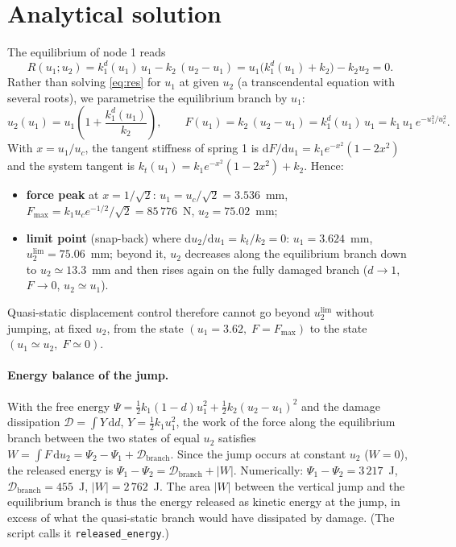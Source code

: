 \documentclass[11pt,a4paper]{article}
\newcommand{\dd}{\mathrm{d}}
\newcommand{\kd}{k_1^{d}}
\begin{document}
\section{Analytical solution}
\label{sec:ana}
The equilibrium of node 1 reads
\begin{equation}
  R(u_1;u_2) = \kd(u_1)\,u_1 - k_2\,(u_2-u_1) = u_1\bigl(\kd(u_1)+k_2\bigr) - k_2u_2 = 0 .
  \label{eq:res}
\end{equation}
Rather than solving \eqref{eq:res} for $u_1$ at given $u_2$ (a transcendental equation with
several roots), we parametrise the equilibrium branch by $u_1$:
\begin{equation}
  u_2(u_1) = u_1\left(1+\frac{\kd(u_1)}{k_2}\right),\qquad
  F(u_1) = k_2\,(u_2-u_1) = \kd(u_1)\,u_1 = k_1\,u_1\,e^{-u_1^2/u_c^2}.
  \label{eq:ana}
\end{equation}
With $x=u_1/u_c$, the tangent stiffness of spring 1 is $\dd F/\dd u_1 = k_1 e^{-x^2}(1-2x^2)$ and
the system tangent is $k_t(u_1) = k_1e^{-x^2}(1-2x^2)+k_2$. Hence:
\begin{itemize}
  \item \textbf{force peak} at $x=1/\sqrt2$: $u_1 = u_c/\sqrt2 = 3.536$~mm,
        $F_{\max} = k_1 u_c e^{-1/2}/\sqrt2 = 85\,776$~N, $u_2 = 75.02$~mm;
  \item \textbf{limit point} (snap-back) where $\dd u_2/\dd u_1 = k_t/k_2 = 0$:
        $u_1 = 3.624$~mm, $u_2^{\lim} = 75.06$~mm; beyond it, $u_2$ decreases along the
        equilibrium branch down to $u_2 \simeq 13.3$~mm and then rises again on the fully
        damaged branch ($d\to1$, $F\to0$, $u_2\simeq u_1$).
\end{itemize}
Quasi-static displacement control therefore cannot go beyond $u_2^{\lim}$ without jumping, at
fixed $u_2$, from the state $(u_1 = 3.62,\;F=F_{\max})$ to the state $(u_1\simeq u_2,\;F\simeq0)$.

\paragraph{Energy balance of the jump.}
With the free energy $\Psi = \tfrac12 k_1(1-d)u_1^2 + \tfrac12 k_2(u_2-u_1)^2$ and the damage
dissipation $\mathcal D = \int Y\,\dd d$, $Y=\tfrac12 k_1u_1^2$, the work of the force along the
equilibrium branch between the two states of equal $u_2$ satisfies
$W = \int F\,\dd u_2 = \Psi_2-\Psi_1+\mathcal D_{\text{branch}}$. Since the jump occurs at
constant $u_2$ ($W=0$), the released energy is $\Psi_1-\Psi_2 = \mathcal D_{\text{branch}} + |W|$.
Numerically: $\Psi_1-\Psi_2 = 3\,217$~J, $\mathcal D_{\text{branch}} = 455$~J,
$|W| = 2\,762$~J. The area $|W|$ between the vertical jump and the equilibrium branch is thus
the energy released as kinetic energy at the jump, in excess of what the quasi-static branch
would have dissipated by damage. (The script calls it \texttt{released\_energy}.)
\end{document}
